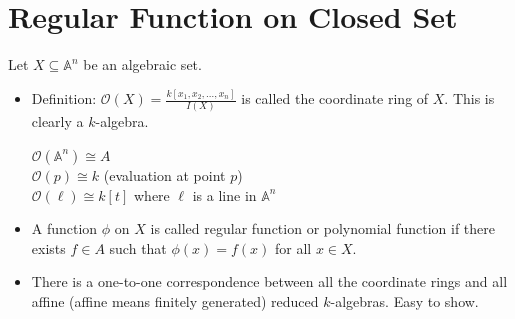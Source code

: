 \documentclass[15pt]{scrartcl}
\newcommand{\A}{\mathbb{A}}
\begin{document}
\section{Regular Function on Closed Set}
Let $X\subseteq \A^n$ be an algebraic set. 
\begin{itemize}
    \subsection{Coordinate Rings}
    \item Definition: $\mathcal{O}(X)=\frac{k[x_1,x_2,\ldots, x_n]}{I(X)}$ is called the coordinate ring of $X$. This is clearly a $k$-algebra.
    \begin{example}
        $\mathcal{O}(\A^n)\cong A$
        \\
        $\mathcal{O}({p})\cong k$ (evaluation at point $p$)
        \\
        $\mathcal{O}(\ell)\cong k[t]$ where $\ell$ is a line in $\A^n$
    \end{example}
    \item A function $\phi$ on $X$ is called regular function or polynomial function if there exists $f\in A$ such that $\phi(x)=f(x)$ for all $x\in X$.
    \item There is a one-to-one correspondence between all the coordinate rings and all affine (affine means finitely generated) reduced $k$-algebras. Easy to show. 

\end{itemize}
\end{document}

